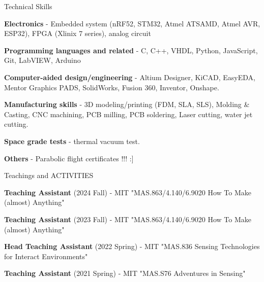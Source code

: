 \documentclass{resume} %
\begin{document}

\begin{rSection}{Technical Skills}

\begin{itemlabel}

\item \textbf{Electronics} - Embedded system (nRF52, STM32, Atmel ATSAMD, Atmel AVR, ESP32), FPGA (Xlinix 7 series), analog circuit
\item \textbf{Programming languages and related} - C, C++, VHDL, Python, JavaScript, Git, LabVIEW, Arduino
\item \textbf{Computer-aided design/engineering} - Altium Designer, KiCAD, EasyEDA, Mentor Graphics PADS, SolidWorks, Fusion 360, Inventor, Onshape.
\item \textbf{Manufacturing skills} - 3D modeling/printing (FDM, SLA, SLS), Molding \& Casting, CNC machining, PCB milling, PCB soldering, Laser cutting, water jet cutting.
\item \textbf{Space grade tests} - thermal vacuum test.
\item \textbf{Others} - Parabolic flight certificates !!! :]
\end{itemlabel}
\end{rSection}

\begin{rSection}{Teachings and ACTIVITIES}

\begin{itemlabel}
\item \textbf{Teaching Assistant} (2024 Fall) - MIT "MAS.863/4.140/6.9020 How To Make (almost) Anything"
\smallskip
\smallskip

\item \textbf{Teaching Assistant} (2023 Fall) - MIT "MAS.863/4.140/6.9020 How To Make (almost) Anything"
\smallskip
\smallskip

\item \textbf{Head Teaching Assistant} (2022 Spring) - MIT "MAS.836 Sensing Technologies for Interact Environments"
\smallskip
\smallskip

\item \textbf{Teaching Assistant} (2021 Spring) - MIT "MAS.S76 Adventures in Sensing"

\end{itemlabel}
\end{rSection}
\end{document}
